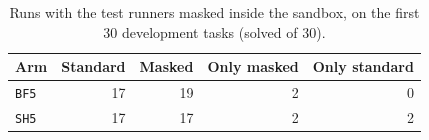 \begin{table}[t]
\centering
\small
\caption{Runs with the test runners masked inside the sandbox, on the first 30 development tasks (solved of 30).}
\label{tab:masked}
\begin{tabular}{lrrrr}
\toprule
Arm & Standard & Masked & Only masked & Only standard \\
\midrule
\texttt{BF5} & 17 & 19 & 2 & 0 \\
\texttt{SH5} & 17 & 17 & 2 & 2 \\
\bottomrule
\end{tabular}
\end{table}

